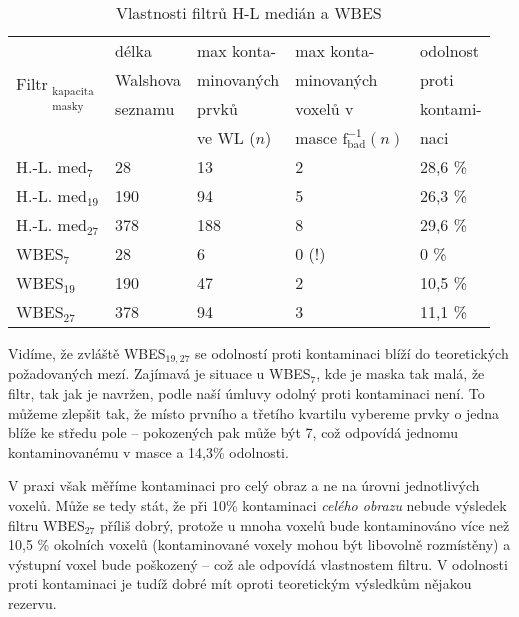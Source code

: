 \begin{table}[h]
    \begin{center}
    \begin{tabular}{lllll}
      \toprule
      \multirow{4}{*}{Filtr$_{\mathrm{\substack{kapacita\\ masky}}}$} 
                                        &délka   & max konta-  & max konta- & odolnost    \\
                                        &Walshova& minovaných  & minovaných & proti       \\
                                        &seznamu & prvků       & voxelů v   & kontami-    \\
                                        &        & ve WL ($n$) & masce $\mathrm{f_{bad}^{-1}}(n)$ & naci \\
      \midrule
      H.-L. med$_{\mathrm{7}}$          & 28  & 13  & 2                 & 28,6 \%      \\
      H.-L. med$_{\mathrm{19}}$         & 190 & 94  & 5                 & 26,3 \%      \\
      H.-L. med$_{\mathrm{27}}$         & 378 & 188 & 8                 & 29,6 \%      \\
      WBES$_{\mathrm{7}}$               & 28  & 6   & 0 (!)             & 0 \%         \\
      WBES$_{\mathrm{19}}$              & 190 & 47  & 2                 & 10,5 \%      \\
      WBES$_{\mathrm{27}}$              & 378 & 94  & 3                 & 11,1 \%      \\
      \bottomrule
    \end{tabular}
    \caption{Vlastnosti filtrů H-L medián a WBES}
    \end{center}
\end{table}\label{tab WBES}

     Vidíme, že zvláště WBES$_{\mathrm{19,27}}$ se odolností proti kontaminaci blíží do teoretických požadovaných mezí. Zajímavá je situace u WBES$_{\mathrm{7}}$, kde je maska tak malá, že filtr, tak jak je navržen, podle naší úmluvy odolný proti kontaminaci není. To můžeme zlepšit tak, že místo prvního a třetího kvartilu vybereme prvky o jedna blíže ke středu pole -- pokozených pak může být 7, což odpovídá jednomu kontaminovanému v masce a 14,3\% odolnosti.
     \vspace{0.5cm}

     V praxi však měříme kontaminaci pro celý obraz a ne na úrovni jednotlivých voxelů. Může se tedy stát, že při 10\% kontaminaci \emph{celého obrazu} nebude výsledek filtru WBES$_{\mathrm{27}}$ příliš dobrý, protože u mnoha voxelů bude kontaminováno více než 10,5 \% okolních voxelů (kontaminované voxely mohou být libovolně rozmístěny) a výstupní voxel bude poškozený -- což ale odpovídá vlastnostem filtru. V odolnosti proti kontaminaci je tudíž dobré mít oproti teoretickým výsledkům nějakou rezervu.

